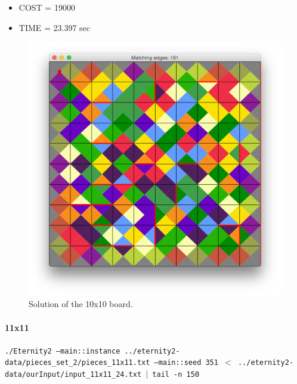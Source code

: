 	\begin{itemize}
		\item COST = 19000
		\item TIME = 23.397 sec
	\end{itemize}
	\begin{figure}[H]
	\centering
	\includegraphics[scale=0.25]{img/sol_10x10}
	\caption{Solution of the 10x10 board.}
	\end{figure}



	\paragraph{11x11}
	\texttt{./Eternity2 --main::instance ../eternity2-data/pieces\_set\_2/pieces\_11x11.txt --main::seed 351 $<$ ../eternity2-data/ourInput/input\_11x11\_24.txt $\mid$ tail -n 150}

